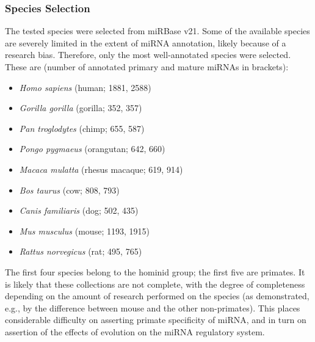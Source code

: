 \begin{method}

\subsubsection{Species Selection}
The tested species were selected from miRBase v21. Some of the available species are severely limited in the extent of miRNA annotation, likely because of a research bias. Therefore, only the most well-annotated species were selected. These are (number of annotated primary and mature miRNAs in brackets):
\begin{itemize}[noitemsep, leftmargin=.5cm, label={\tiny\raisebox{1ex}{\textbullet}}]
\item \emph{Homo sapiens} (human; 1881, 2588)
\item \emph{Gorilla gorilla} (gorilla; 352, 357)
\item \emph{Pan troglodytes} (chimp; 655, 587)
\item \emph{Pongo pygmaeus} (orangutan; 642, 660)
\item \emph{Macaca mulatta} (rhesus macaque; 619, 914)
\item \emph{Bos taurus} (cow; 808, 793)
\item \emph{Canis familiaris} (dog; 502, 435)
\item \emph{Mus musculus} (mouse; 1193, 1915)
\item \emph{Rattus norvegicus} (rat; 495, 765)
\end{itemize}
The first four species belong to the hominid group; the first five are primates. It is likely that these collections are not complete, with the degree of completeness depending on the amount of research performed on the species (as demonstrated, e.g., by the difference between mouse and the other non-primates). This places considerable difficulty on asserting primate specificity of miRNA, and in turn on assertion of the effects of evolution on the miRNA regulatory system.


\end{method}
